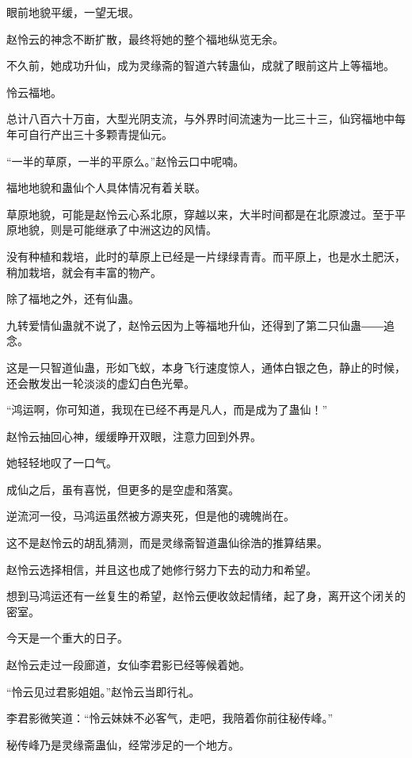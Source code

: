 
\begin{this_body}

眼前地貌平缓，一望无垠。

赵怜云的神念不断扩散，最终将她的整个福地纵览无余。

不久前，她成功升仙，成为灵缘斋的智道六转蛊仙，成就了眼前这片上等福地。

怜云福地。

总计八百六十万亩，大型光阴支流，与外界时间流速为一比三十三，仙窍福地中每年可自行产出三十多颗青提仙元。

“一半的草原，一半的平原么。”赵怜云口中呢喃。

福地地貌和蛊仙个人具体情况有着关联。

草原地貌，可能是赵怜云心系北原，穿越以来，大半时间都是在北原渡过。至于平原地貌，则是可能继承了中洲这边的风情。

没有种植和栽培，此时的草原上已经是一片绿绿青青。而平原上，也是水土肥沃，稍加栽培，就会有丰富的物产。

除了福地之外，还有仙蛊。

九转爱情仙蛊就不说了，赵怜云因为上等福地升仙，还得到了第二只仙蛊――追念。

这是一只智道仙蛊，形如飞蚁，本身飞行速度惊人，通体白银之色，静止的时候，还会散发出一轮淡淡的虚幻白色光晕。

“鸿运啊，你可知道，我现在已经不再是凡人，而是成为了蛊仙！”

赵怜云抽回心神，缓缓睁开双眼，注意力回到外界。

她轻轻地叹了一口气。

成仙之后，虽有喜悦，但更多的是空虚和落寞。

逆流河一役，马鸿运虽然被方源夹死，但是他的魂魄尚在。

这不是赵怜云的胡乱猜测，而是灵缘斋智道蛊仙徐浩的推算结果。

赵怜云选择相信，并且这也成了她修行努力下去的动力和希望。

想到马鸿运还有一丝复生的希望，赵怜云便收敛起情绪，起了身，离开这个闭关的密室。

今天是一个重大的日子。

赵怜云走过一段廊道，女仙李君影已经等候着她。

“怜云见过君影姐姐。”赵怜云当即行礼。

李君影微笑道：“怜云妹妹不必客气，走吧，我陪着你前往秘传峰。”

秘传峰乃是灵缘斋蛊仙，经常涉足的一个地方。


\end{this_body}
